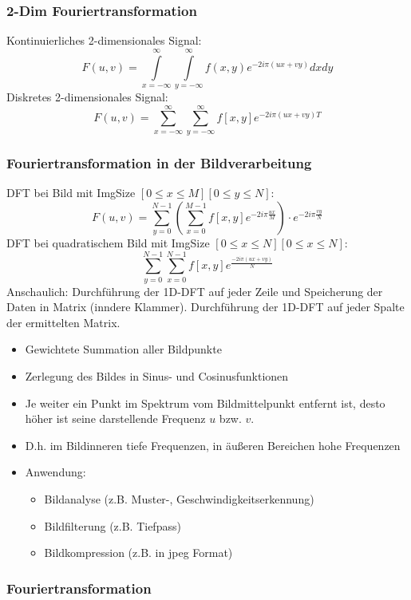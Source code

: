 \subsubsection*{2-Dim Fouriertransformation}

Kontinuierliches 2-dimensionales Signal: $$F(u,v) = \int\limits_{x = - \infty}^{\infty} \int\limits_{y = - \infty}^{\infty} f(x,y) e^{-2i\pi (ux + vy)} dxdy$$
Diskretes 2-dimensionales Signal: $$F(u,v) = \sum\limits_{x = - \infty}^{\infty} \sum\limits_{y = - \infty}^{\infty} f[x,y] e^{-2i\pi (ux + vy)T}$$

\subsubsection*{Fouriertransformation in der Bildverarbeitung}

DFT bei Bild mit ImgSize $[0 \leq x \leq M][0 \leq y \leq N]$: $$F(u,v) = \sum\limits_{y=0}^{N-1} \left( \sum\limits_{x=0}^{M-1} f[x,y] e^{-2i\pi \frac{ux}{M}} \right) \cdot e^{-2i\pi \frac{vy}{N}}$$
DFT bei quadratischem Bild mit ImgSize $[0 \leq x \leq N][0 \leq x \leq N]$: $$\sum\limits_{y=0}^{N-1} \sum\limits_{x=0}^{N-1} f[x,y] e^{\frac{-2i\pi (ux + vy)}{N}}$$
Anschaulich: Durchführung der 1D-DFT auf jeder Zeile und Speicherung der Daten in Matrix (inndere Klammer). Durchführung der 1D-DFT auf jeder Spalte der ermittelten Matrix.

\begin{itemize}
\item Gewichtete Summation aller Bildpunkte
\item Zerlegung des Bildes in Sinus- und Cosinusfunktionen
\item Je weiter ein Punkt im Spektrum vom Bildmittelpunkt entfernt ist, desto höher ist seine darstellende Frequenz $u$ bzw. $v$.
\item D.h. im Bildinneren tiefe Frequenzen, in äußeren Bereichen hohe Frequenzen
\item Anwendung:
\begin{itemize}
\item Bildanalyse (z.B. Muster-, Geschwindigkeitserkennung)
\item Bildfilterung (z.B. Tiefpass)
\item Bildkompression (z.B. in jpeg Format)
\end{itemize}
\end{itemize}

\subsubsection*{Fouriertransformation}

